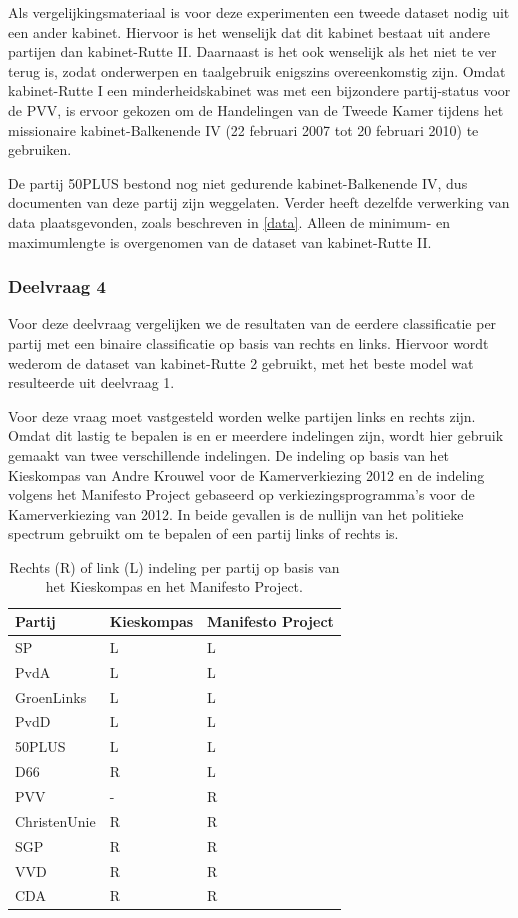 Als vergelijkingsmateriaal is voor deze experimenten een tweede dataset nodig uit een ander kabinet. Hiervoor is het wenselijk dat dit kabinet bestaat uit andere partijen dan kabinet-Rutte II. Daarnaast is het ook wenselijk als het niet te ver terug is, zodat onderwerpen en taalgebruik enigszins overeenkomstig zijn. Omdat kabinet-Rutte I een minderheidskabinet was met een bijzondere partij-status voor de PVV, is ervoor gekozen om de Handelingen van de Tweede Kamer tijdens het missionaire kabinet-Balkenende IV (22 februari 2007 tot 20 februari 2010) te gebruiken.\par
De partij 50PLUS bestond nog niet gedurende kabinet-Balkenende IV, dus documenten van deze partij zijn weggelaten. Verder heeft dezelfde verwerking van data plaatsgevonden, zoals beschreven in \ref{data}. Alleen de minimum- en maximumlengte is overgenomen van de dataset van kabinet-Rutte II.\par

\subsubsection{Deelvraag 4}
Voor deze deelvraag vergelijken we de resultaten van de eerdere classificatie per partij met een binaire classificatie op basis van rechts en links. Hiervoor wordt wederom de dataset van kabinet-Rutte 2 gebruikt, met het beste model wat resulteerde uit deelvraag 1. \par
Voor deze vraag moet vastgesteld worden welke partijen links en rechts zijn. Omdat dit lastig te bepalen is en er meerdere indelingen zijn, wordt hier gebruik gemaakt van twee verschillende indelingen. De indeling op basis van het Kieskompas van Andre Krouwel voor de Kamerverkiezing 2012 en de indeling volgens het Manifesto Project\cite{Volkens:2017} gebaseerd op verkiezingsprogramma's voor de Kamerverkiezing van 2012. In beide gevallen is de nullijn van het politieke spectrum gebruikt om te bepalen of een partij links of rechts is.\par

\begin{table}[H]
\centering
\caption{Rechts (R) of link (L) indeling per partij op basis van het Kieskompas en het Manifesto Project.}
\label{my-label}
\centering
\begin{tabular}{lll}
\hline
Partij  & Kieskompas & Manifesto Project \\ \hline
SP           & L & L\\ 
PvdA         & L & L\\ 
GroenLinks   & L & L\\ 
PvdD         & L & L\\ 
50PLUS       & L & L\\ 
D66          & R & L\\ 
PVV          & - & R\\ 
ChristenUnie & R & R\\ 
SGP          & R & R\\ 
VVD          & R & R\\ 
CDA          & R & R\\
\end{tabular}
\end{table}


